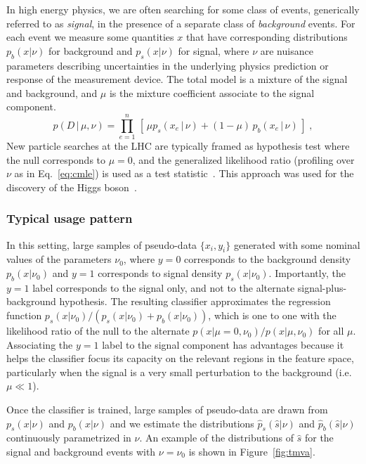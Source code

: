 \documentclass[12pt]{article}
\numberwithin{equation}{section}
\theoremstyle{plain}
\begin{document}
In high energy physics, we are often searching for some class of events,
generically referred to as \textit{signal}, in the presence of a separate class
of \textit{background} events.  For each event we measure some quantities $x$
that have corresponding distributions $p_b(x|\nu)$ for background and
$p_s(x|\nu)$ for signal, where $\nu$ are nuisance parameters describing
uncertainties in the underlying physics prediction or response of the
measurement device. The total model is a mixture of the signal and background,
and $\mu$ is the mixture coefficient associate to the signal component.
\begin{equation}\label{eq:hepGen}
p( D \,|\, \mu, \nu) = \prod_{e=1}^n \, \left[\, \mu p_s( x_e \, |\,  \nu)  + (1-\mu)\, p_b( x_e \,|\, \nu) \,\right] \; ,
\end{equation}
New particle searches at the LHC are typically framed as hypothesis test where
the null corresponds to $\mu=0$, and the generalized likelihood ratio (profiling
over $\nu$ as in Eq.~\ref{eq:cmle}) is used as a test
statistic~\citep{Cowan:2010js}. This approach was used for the discovery of the
Higgs boson~\citep{Aad:2012tfa,Chatrchyan:2012ufa}.

\subsubsection{Typical usage pattern}

In this setting, large samples of pseudo-data $\{x_i, y_i\}$ generated with some
nominal values of the parameters $\nu_0$, where $y=0$ corresponds to the
background density $p_b(x|\nu_0)$  and $y=1$ corresponds to signal density
$p_s(x|\nu_0)$. Importantly, the $y=1$ label corresponds to the signal only, and
not to the alternate signal-plus-background hypothesis. The resulting classifier
approximates the regression function $p_s(x|\nu_0)/(p_s(x|\nu_0)+p_b(x|\nu_0))$,
which is one to one with the likelihood ratio of the null to the alternate
$p(x|\mu=0,\nu_0)/p(x|\mu,\nu_0)$ for all $\mu$. Associating the $y=1$ label to
the signal component has advantages because it helps the classifier focus its
capacity on the relevant regions in the feature space, particularly when the
signal is a very small perturbation to the background (i.e. $\mu \ll 1$).

 Once the classifier is trained, large samples of pseudo-data are drawn from
 $p_s(x | \nu)$ and $p_b(x | \nu)$ and we estimate the distributions
 $\hat{p}_s(\hat s | \nu)$ and $\hat{p}_b(\hat s | \nu)$ continuously
 parametrized in $\nu$. An example of the distributions of $\hat s$ for the
 signal and background events with $\nu=\nu_0$ is shown in
 Figure~\ref{fig:tmva}.
\end{document}
